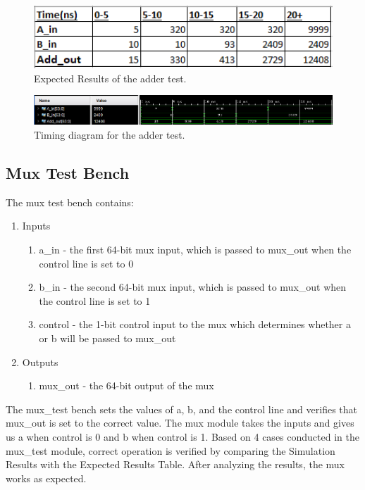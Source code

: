 \documentclass{article}
\begin{document}
\begin{figure}
	\begin{center}
		\caption{Expected Results of the adder test.}\label{fig:ert_addertest}
		\includegraphics[width=1.0\textwidth]{../images/AdderExpected.png}
	\end{center}
\end{figure}

\begin{figure}
	\begin{center}
		\caption{Timing diagram for the adder test.}\label{fig:addertest}
		\includegraphics[width=1.0\textwidth]{../images/AdderSimulation.png}
	\end{center}
\end{figure}

\subsection{Mux Test Bench}
The mux test bench contains:
\begin{enumerate}
	\item Inputs
	\begin{enumerate}
		\item a\_in - the first 64-bit mux input, which is passed to mux\_out when the control line is set to 0 
		\item b\_in - the second 64-bit mux input, which is passed to mux\_out when the control line is set to 1
		\item control - the 1-bit control input to the mux which determines whether a or b will be passed to mux\_out
	\end{enumerate}	
	\item Outputs
	\begin{enumerate}	
		\item mux\_out - the 64-bit output of the mux
	\end{enumerate}
\end{enumerate} 

The mux\_test bench sets the values of a, b, and the control line and verifies that mux\_out is set to the correct value. The mux module takes the inputs and gives us a when control is 0 and b when control is 1. Based on 4 cases conducted in the mux\_test module, correct operation is verified by comparing the Simulation Results with the Expected Results Table.  After analyzing the results, the mux works as expected.
\end{document}
